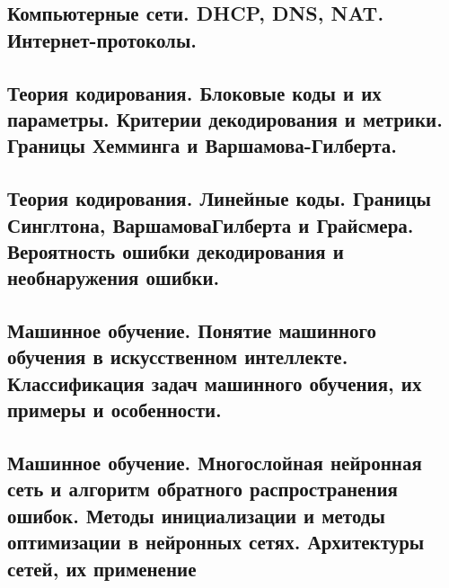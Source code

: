 \documentclass{article}
\begin{document}




















\subsection{Компьютерные сети. DHCP, DNS, NAT. Интернет-протоколы.}







\subsection{Теория кодирования. Блоковые коды и их параметры. Критерии декодирования и метрики. Границы Хемминга и Варшамова-Гилберта.}

\subsection{Теория кодирования. Линейные коды. Границы Синглтона, ВаршамоваГилберта и Грайсмера. Вероятность ошибки декодирования и необнаружения ошибки.}

\subsection{Машинное обучение. Понятие машинного обучения в искусственном интеллекте. Классификация задач машинного обучения, их примеры и особенности.}

\subsection{Машинное обучение. Многослойная нейронная сеть и алгоритм обратного распространения ошибок. Методы инициализации и методы оптимизации в нейронных сетях. Архитектуры сетей, их применение}
\end{document}
